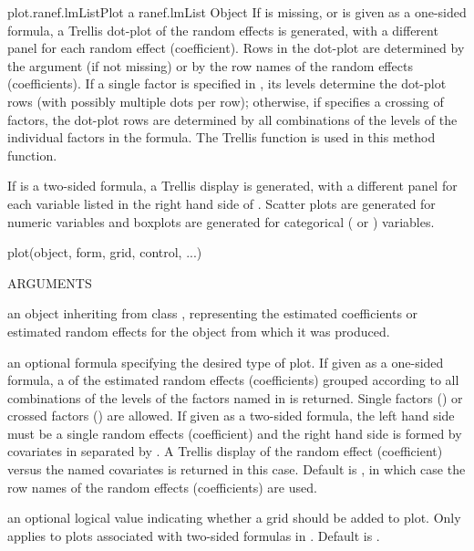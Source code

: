 \documentclass[pdftex]{article} \usepackage{url,graphicx}
\renewcommand{\Twiddle}{\mbox{\(\sim\)}}
\begin{document}
\begin{Helpfile}{plot.ranef.lmList}{Plot a ranef.lmList Object}
If  is missing, or is given as a one-sided formula, a
Trellis dot-plot of the random effects is generated, with a different
panel for each random effect (coefficient). Rows in the dot-plot are
determined by the  argument (if not missing) or by the row
names of the random effects (coefficients). If a single factor is
specified in , its levels determine the dot-plot rows
(with possibly multiple dots per row); otherwise, if 
specifies a crossing of factors, the dot-plot rows are determined by
all combinations of the levels of the individual factors in the 
formula. The Trellis function  is used in this method
function.

If  is a two-sided formula, a Trellis display is generated,
with a different panel for each variable listed in the right hand side
of . Scatter plots are generated for numeric variables and
boxplots are generated for categorical ( or
) variables.
\begin{Example}
plot(object, form, grid, control, ...)
\end{Example}
\begin{Argument}{ARGUMENTS}
\item[\Co{object:}]
an object inheriting from class
, representing the estimated coefficients or
estimated random effects for the  object from which it was
produced.
\item[\Co{form:}]
an optional formula specifying the desired type of plot. If
given as a one-sided formula, a  of the estimated
random effects (coefficients) grouped according to all combinations of
the levels of the factors named in  is returned. Single
factors (\Co{{\Twiddle}g}) or crossed factors (\Co{{\Twiddle}g1*g2}) are
allowed. If given as a two-sided formula, the left hand side must
be a single random effects (coefficient) and the right hand side
is formed by covariates in  separated by \Co{+}. A
Trellis display of the random effect (coefficient) versus the named
covariates is returned in this case. Default is , in
which case  the row names of the random effects (coefficients) are
used.
\item[\Co{grid:}]
an optional logical value indicating whether a grid should
be added to plot. Only applies to plots associated with two-sided
formulas in . Default is .
\item[\Co{control:}]

\end{Argument}
\end{Helpfile}
\end{document}
